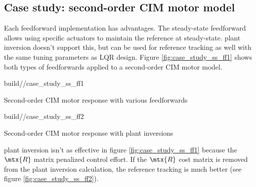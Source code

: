 \subsection{Case study: second-order CIM motor model}

Each feedforward implementation has advantages. The steady-state feedforward
allows using specific actuators to maintain the \gls{reference} at steady-state.
\Gls{plant} inversion doesn't support this, but can be used for \gls{reference}
\gls{tracking} as well with the same tuning parameters as LQR design. Figure
\ref{fig:case_study_ss_ff1} shows both types of feedforwards applied to a
second-order CIM motor model.
\begin{bookfigure}
  \begin{minisvg}{2}{build/\partpath/case_study_ss_ff1}
    \caption{Second-order CIM motor response with various feedforwards}
    \label{fig:case_study_ss_ff1}
  \end{minisvg}
  \hfill
  \begin{minisvg}{2}{build/\partpath/case_study_ss_ff2}
    \caption{Second-order CIM motor response with plant inversions}
    \label{fig:case_study_ss_ff2}
  \end{minisvg}
\end{bookfigure}

\Gls{plant} inversion isn't as effective in figure \ref{fig:case_study_ss_ff1}
because the $\mtx{R}$ matrix penalized \gls{control effort}. If the $\mtx{R}$
cost matrix is removed from the \gls{plant} inversion calculation, the
\gls{reference} \gls{tracking} is much better (see figure
\ref{fig:case_study_ss_ff2}).
